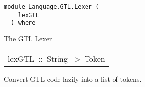 \label{module:Language.GTL.Lexer}
\haddockbeginheader
{\haddockverb\begin{verbatim}
module Language.GTL.Lexer (
    lexGTL
  ) where\end{verbatim}}
\haddockendheader

The GTL Lexer  
\par

\begin{haddockdesc}
\item[\begin{tabular}{@{}l}
lexGTL\ ::\ String\ ->\ {\char 91}Token{\char 93}
\end{tabular}]\haddockbegindoc
Convert GTL code lazily into a list of tokens.
\par

\end{haddockdesc}